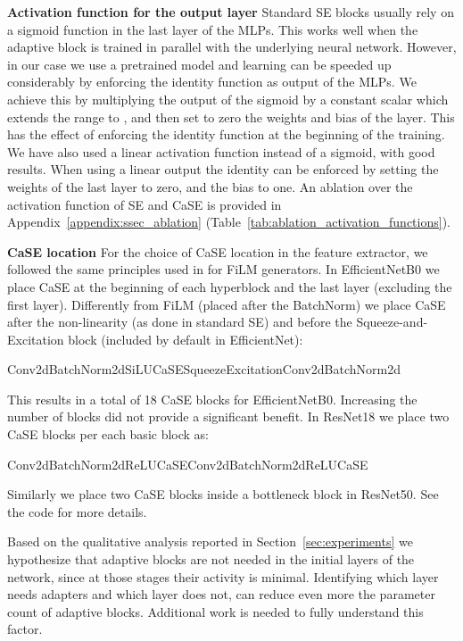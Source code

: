 \documentclass{article}
\begin{document}
\textbf{Activation function for the output layer} Standard SE blocks usually rely on a sigmoid function in the last layer of the MLPs. This works well when the adaptive block is trained in parallel with the underlying neural network. However, in our case we use a pretrained model and learning can be speeded up considerably by enforcing the identity function as output of the MLPs. We achieve this by multiplying the output of the sigmoid by a constant scalar  which extends the range to , and then set to zero the weights and bias of the layer. This has the effect of enforcing the identity function at the beginning of the training. We have also used a linear activation function instead of a sigmoid, with good results. When using a linear output the identity can be enforced by setting the weights of the last layer to zero, and the bias to one.
An ablation over the activation function of SE and CaSE is provided in Appendix~\ref{appendix:ssec_ablation} (Table~\ref{tab:ablation_activation_functions}).


\textbf{CaSE location} For the choice of CaSE location in the feature extractor, we followed the same principles used in \cite{bronskill2021memory} for FiLM generators. In EfficientNetB0 we place CaSE at the beginning of each hyperblock and the last layer (excluding the first layer). Differently from FiLM (placed after the BatchNorm) we place CaSE after the non-linearity (as done in standard SE) and before the Squeeze-and-Excitation block (included by default in EfficientNet):

\begin{center}
Conv2dBatchNorm2dSiLUCaSESqueezeExcitationConv2dBatchNorm2d
\end{center}

This results in a total of 18 CaSE blocks for EfficientNetB0. Increasing the number of blocks did not provide a significant benefit. In ResNet18 we place two CaSE blocks per each basic block as: 

\begin{center}
Conv2dBatchNorm2dReLUCaSEConv2dBatchNorm2dReLUCaSE
\end{center}

Similarly we place two CaSE blocks inside a bottleneck block in ResNet50. See the code for more details. 

Based on the qualitative analysis reported in Section~\ref{sec:experiments} we hypothesize that adaptive blocks are not needed in the initial layers of the network, since at those stages their activity is minimal. Identifying which layer needs adapters and which layer does not, can reduce even more the parameter count of adaptive blocks. Additional work is needed to fully understand this factor.
\end{document}
